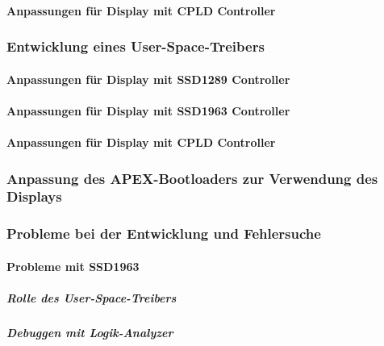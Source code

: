\paragraph{Anpassungen für Display mit CPLD Controller}
\subsubsection{Entwicklung eines User-Space-Treibers}
\paragraph{Anpassungen für Display mit SSD1289 Controller}
\paragraph{Anpassungen für Display mit SSD1963 Controller}
\paragraph{Anpassungen für Display mit CPLD Controller}
\subsubsection{Anpassung des APEX-Bootloaders zur Verwendung des Displays}
\subsubsection{Probleme bei der Entwicklung und Fehlersuche}
\paragraph{Probleme mit SSD1963}
\subparagraph{Rolle des User-Space-Treibers}
\subparagraph{Debuggen mit Logik-Analyzer}



